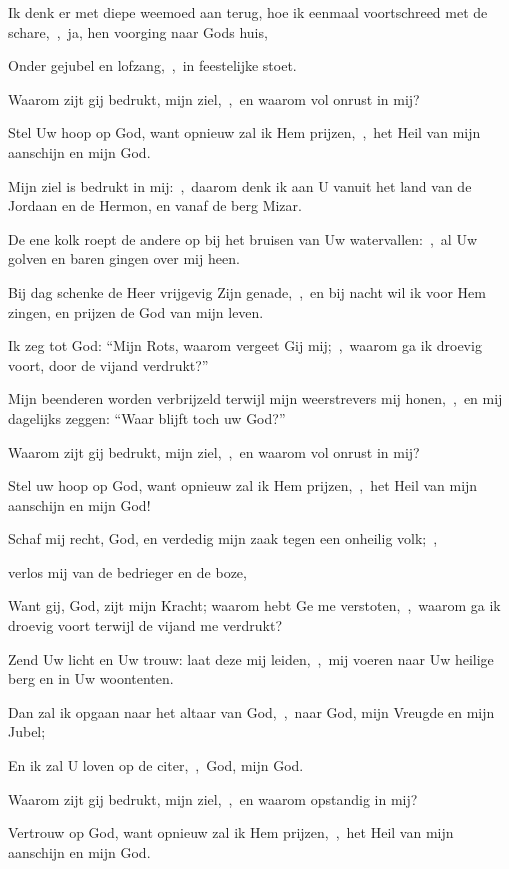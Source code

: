 \documentclass[12pt,twoside,a5paper]{article}
\begin{document}
\begin{halfparskip}
  Ik denk er met diepe weemoed aan terug, hoe ik eenmaal voortschreed met de schare,~\sep\ ja, hen voorging naar Gods huis,

  Onder gejubel en lofzang,~\sep\ in feestelijke stoet.

  Waarom zijt gij bedrukt, mijn ziel,~\sep\ en waarom vol onrust in mij?

  Stel Uw hoop op God, want opnieuw zal ik Hem prijzen,~\sep\ het Heil van mijn aanschijn en mijn God.

  Mijn ziel is bedrukt in mij:~\sep\ daarom denk ik aan U vanuit het land van de Jordaan en de Hermon, en vanaf de berg Mizar.

  De ene kolk roept de andere op bij het bruisen van Uw watervallen:~\sep\ al Uw golven en baren gingen over mij heen.

  Bij dag schenke de Heer vrijgevig Zijn genade,~\sep\ en bij nacht wil ik voor Hem zingen, en prijzen de God van mijn leven.

  Ik zeg tot God: ``Mijn Rots, waarom vergeet Gij mij;~\sep\ waarom ga ik droevig voort, door de vijand verdrukt?''

  Mijn beenderen worden verbrijzeld terwijl mijn weerstrevers mij honen,~\sep\ en mij dagelijks zeggen: ``Waar blijft toch uw God?''

  Waarom zijt gij bedrukt, mijn ziel,~\sep\ en waarom vol onrust in mij?

  Stel uw hoop op God, want opnieuw zal ik Hem prijzen,~\sep\ het Heil van mijn aanschijn en mijn God!

   Schaf mij recht, God, en verdedig mijn zaak tegen een onheilig volk;~\sep

  verlos mij van de bedrieger en de boze,

  Want gij, God, zijt mijn Kracht; waarom hebt Ge me verstoten,~\sep\ waarom ga ik droevig voort terwijl de vijand me verdrukt?

  Zend Uw licht en Uw trouw: laat deze mij leiden,~\sep\ mij voeren naar Uw heilige berg en in Uw woontenten.

  Dan zal ik opgaan naar het altaar van God,~\sep\ naar God, mijn Vreugde en mijn Jubel;

  En ik zal U loven op de citer,~\sep\ God, mijn God.

  Waarom zijt gij bedrukt, mijn ziel,~\sep\ en waarom opstandig in mij?

  Vertrouw op God, want opnieuw zal ik Hem prijzen,~\sep\ het Heil van mijn aanschijn en mijn God.
\end{halfparskip}
\end{document}
